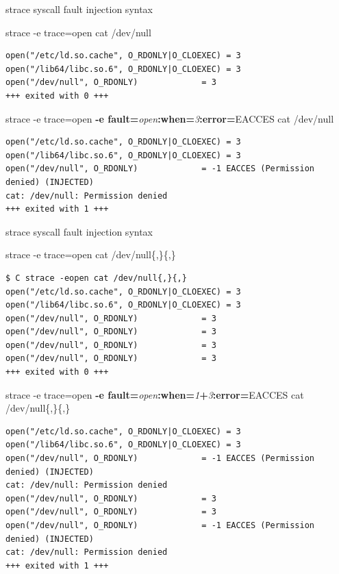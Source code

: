 \documentclass[unicode,aspectratio=169]{beamer}
\begin{document}
\begin{frame}[fragile]{strace syscall fault injection syntax}
\scriptsize
\begin{block}{\large strace -e trace=open cat /dev/null}
\begin{verbatim}
open("/etc/ld.so.cache", O_RDONLY|O_CLOEXEC) = 3
open("/lib64/libc.so.6", O_RDONLY|O_CLOEXEC) = 3
open("/dev/null", O_RDONLY)             = 3
+++ exited with 0 +++
\end{verbatim}
\end{block}
\begin{block}{\large strace -e trace=open {\bf -e fault=}{\it open}{\bf :when=}{\it 3}{\bf :error=}{\sc EACCES} cat /dev/null}
\begin{verbatim}
open("/etc/ld.so.cache", O_RDONLY|O_CLOEXEC) = 3
open("/lib64/libc.so.6", O_RDONLY|O_CLOEXEC) = 3
open("/dev/null", O_RDONLY)             = -1 EACCES (Permission denied) (INJECTED)
cat: /dev/null: Permission denied
+++ exited with 1 +++
\end{verbatim}
\end{block}
\end{frame}

\begin{frame}[fragile]{strace syscall fault injection syntax}
\scriptsize
\begin{block}{strace -e trace=open cat /dev/null\{,\}\{,\}}
\begin{verbatim}
$ C strace -eopen cat /dev/null{,}{,}
open("/etc/ld.so.cache", O_RDONLY|O_CLOEXEC) = 3
open("/lib64/libc.so.6", O_RDONLY|O_CLOEXEC) = 3
open("/dev/null", O_RDONLY)             = 3
open("/dev/null", O_RDONLY)             = 3
open("/dev/null", O_RDONLY)             = 3
open("/dev/null", O_RDONLY)             = 3
+++ exited with 0 +++
\end{verbatim}
\end{block}
\begin{block}{strace -e trace=open {\bf -e fault=}{\it open}{\bf :when=}{\it 1}{\bf +}{\it 3}{\bf :error=}{\sc EACCES} cat /dev/null\{,\}\{,\}}
\begin{verbatim}
open("/etc/ld.so.cache", O_RDONLY|O_CLOEXEC) = 3
open("/lib64/libc.so.6", O_RDONLY|O_CLOEXEC) = 3
open("/dev/null", O_RDONLY)             = -1 EACCES (Permission denied) (INJECTED)
cat: /dev/null: Permission denied
open("/dev/null", O_RDONLY)             = 3
open("/dev/null", O_RDONLY)             = 3
open("/dev/null", O_RDONLY)             = -1 EACCES (Permission denied) (INJECTED)
cat: /dev/null: Permission denied
+++ exited with 1 +++
\end{verbatim}
\end{block}
\end{frame}
\end{document}
